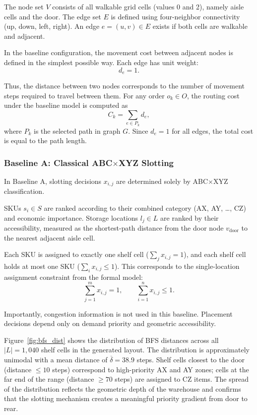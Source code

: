 \documentclass[12pt,a4paper]{article}
\begin{document}
The node set $V$ consists of all walkable grid cells (values 0 and 2), namely aisle cells and
the door. The edge set $E$ is defined using four-neighbor connectivity (up, down, left, right).
An edge $e = (u, v) \in E$ exists if both cells are walkable and adjacent.

In the baseline configuration, the movement cost between adjacent nodes is defined in the
simplest possible way. Each edge has unit weight:
\[
  d_e = 1.
\]

Thus, the distance between two nodes corresponds to the number of movement steps required
to travel between them. For any order $o_k \in O$, the routing cost under the baseline model
is computed as
\[
  C_k = \sum_{e \in P_k} d_e,
\]
where $P_k$ is the selected path in graph $G$. Since $d_e = 1$ for all edges, the total cost is
equal to the path length.

\subsubsection{Baseline A: Classical ABC$\times$XYZ Slotting}

In Baseline A, slotting decisions $x_{i,j}$ are determined solely by ABC$\times$XYZ
classification.

SKUs $s_i \in S$ are ranked according to their combined category (AX, AY, \ldots, CZ) and
economic importance. Storage locations $l_j \in L$ are ranked by their accessibility,
measured as the shortest-path distance from the door node $v_\mathrm{door}$ to the nearest
adjacent aisle cell.

Each SKU is assigned to exactly one shelf cell ($\sum_j x_{i,j} = 1$), and each shelf
cell holds at most one SKU ($\sum_i x_{i,j} \leq 1$). This corresponds to the
single-location assignment constraint from the formal model:
\[
  \sum_{j=1}^{m} x_{i,j} = 1,
  \qquad
  \sum_{i=1}^{n} x_{i,j} \leq 1.
\]

Importantly, congestion information is not used in this baseline. Placement decisions depend
only on demand priority and geometric accessibility.

Figure~\ref{fig:bfs_dist} shows the distribution of BFS distances across all
$|L| = 1{,}040$ shelf cells in the generated layout. The distribution is approximately
unimodal with a mean distance of $\overline{\delta} = 38.9$ steps. Shelf cells closest
to the door (distance $\leq 10$ steps) correspond to high-priority AX and AY zones;
cells at the far end of the range (distance $\geq 70$ steps) are assigned to CZ items.
The spread of the distribution reflects the geometric depth of the warehouse and confirms
that the slotting mechanism creates a meaningful priority gradient from door to rear.
\end{document}
